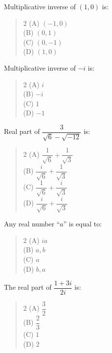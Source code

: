 \documentclass[11pt,a4paper]{article}
\begin{document}
\begin{mcqlist}
\item Multiplicative inverse of $(1,0)$ is:
\begin{quote}\begin{multicols}{2}
\noindent (A) $(-1,0)$ \\
(B) $(0,1)$ \\
(C) $(0,-1)$ \\
(D) $(1,0)$
\end{multicols}\end{quote}

\item Multiplicative inverse of $-i$ is:
\begin{quote}\begin{multicols}{2}
\noindent (A) $i$ \\
(B) $-i$ \\
(C) $1$ \\
(D) $-1$
\end{multicols}\end{quote}

\item Real part of $\dfrac{3}{\sqrt{6}-\sqrt{-12}}$ is:
\begin{quote}\begin{multicols}{2}
\noindent (A) $\dfrac{1}{\sqrt6}+\dfrac{1}{\sqrt3}$ \\
(B) $\dfrac{i}{\sqrt6}+\dfrac{1}{\sqrt3}$ \\
(C) $\dfrac{1}{\sqrt6}+\dfrac{i}{\sqrt3}$ \\
(D) $\dfrac{i}{\sqrt6}+\dfrac{i}{\sqrt3}$
\end{multicols}\end{quote}

\item Any real number ``$a$'' is equal to:
\begin{quote}\begin{multicols}{2}
\noindent (A) $ia$ \\
(B) $a,b$ \\
(C) $a$ \\
(D) $b,a$
\end{multicols}\end{quote}

\item The real part of $\dfrac{1+3i}{2i}$ is:
\begin{quote}\begin{multicols}{2}
\noindent (A) $\dfrac{3}{2}$ \\
(B) $\dfrac{2}{3}$ \\
(C) $1$ \\
(D) $2$
\end{multicols}\end{quote}


\end{mcqlist}
\end{document}
